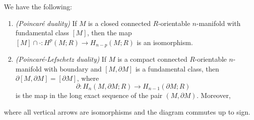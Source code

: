 \begin{theorem}
  We have the following:
  \begin{enumerate}
    \item \emph{(Poincar\'e duality)}
      If $M$ is a closed connected
      $R$-orientable $n$-manifold with
      fundamental class $[M]$, then the
      map $[M] \cap \cdot : H^p(M; R) \to H_{n - p}(M; R)$
      is an isomorphism.
    \item \emph{(Poincar\'e-Lefschetz duality)}
      If $M$ is a compact connected
      $R$-orientable $n$-manifold with boundary
      and $[M, \partial M]$ is a fundamental class,
      then $\partial[M, \partial M] = [\partial M]$, where
      \[
        \partial : H_n(M, \partial M; R) \to H_{n - 1}(\partial M; R)
      \]
      is the map in the long exact sequence of
      the pair $(M, \partial M)$. Moreover,
      \begin{center}
        \hspace{-1em}
      \end{center}
  \end{enumerate}
  where all vertical arrows are isomorphisms
  and the diagram commutes up to sign.
\end{theorem}
